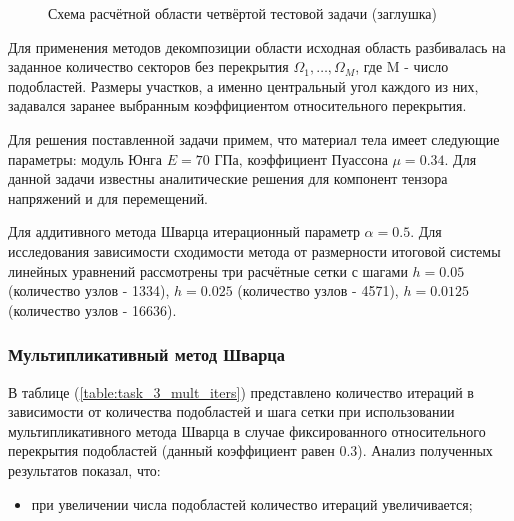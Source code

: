 \documentclass[a4paper]{article}
\begin{document}
\begin{figure}[h]
\caption{Схема расчётной области четвёртой тестовой задачи (заглушка)}
\label{fig:task_04_scheme}
\end{figure}

Для применения методов декомпозиции области исходная область разбивалась на заданное количество секторов без перекрытия $\Omega_1, \ldots, \Omega_M$, где M - число подобластей. Размеры участков, а именно центральный угол каждого из них, задавался заранее выбранным коэффициентом относительного перекрытия.

Для решения поставленной задачи примем, что материал тела имеет следующие параметры: модуль Юнга $E = 70$ ГПа, коэффициент Пуассона $\mu = 0.34$. Для данной задачи известны аналитические решения для компонент тензора напряжений и для перемещений.

Для аддитивного метода Шварца итерационный параметр $\alpha = 0.5$. Для исследования зависимости сходимости метода от размерности итоговой системы линейных уравнений рассмотрены три расчётные сетки с шагами $h = 0.05$ (количество узлов - 1334), $h = 0.025$ (количество узлов - 4571), $h = 0.0125$ (количество узлов - 16636).

\subsubsection{Мультипликативный метод Шварца}

В таблице (\ref{table:task_3_mult_iters}) представлено количество итераций в зависимости от количества подобластей и шага сетки при использовании мультипликативного метода Шварца в случае фиксированного относительного перекрытия подобластей (данный коэффициент равен 0.3). Анализ полученных результатов показал, что:
\begin{itemize}
\item при увеличении числа подобластей количество итераций увеличивается;
\end{itemize}
\end{document}
